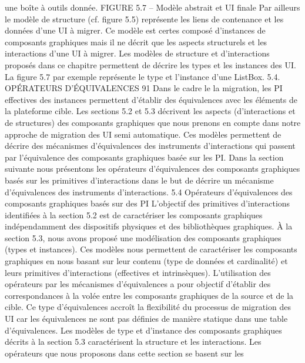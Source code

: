 \documentclass{article}
\begin{document}
une bo\^{i}te \`{a} outils donn\'{e}e.
FIGURE 5.7 – Mod\`{e}le abstrait et UI ﬁnale
Par ailleurs le mod\`{e}le de structure (cf. ﬁgure 5.5) repr\'{e}sente les liens de contenance et les donn\'{e}es
d’une UI \`{a} migrer. Ce mod\`{e}le est certes compos\'{e} d’instances de composants graphiques mais il ne
d\'{e}crit que les aspects structurels et les interactions d’une UI \`{a} migrer.
Les mod\`{e}les de structure et d’interactions propos\'{e}s dans ce chapitre permettent de d\'{e}crire les
types et les instances des UI. La ﬁgure 5.7 par exemple repr\'{e}sente le type et l’instance d’une ListBox.
5.4. OPÉRATEURS D’ÉQUIVALENCES
91
Dans le cadre le la migration, les PI effectives des instances permettent d’\'{e}tablir des \'{e}quivalences avec
les \'{e}l\'{e}ments de la plateforme cible.
Les sections 5.2 et 5.3 d\'{e}crivent les aspects (d’interactions et de structures) des composants graphiques que nous prenons en compte dans notre approche de migration des UI semi automatique.
Ces mod\`{e}les permettent de d\'{e}crire des m\'{e}canismes d’\'{e}quivalences des instruments d’interactions qui
passent par l’\'{e}quivalence des composants graphiques bas\'{e}e sur les PI. Dans la section suivante nous
pr\'{e}sentons les op\'{e}rateurs d’\'{e}quivalences des composants graphiques bas\'{e}s sur les primitives d’interactions dans le but de d\'{e}crire un m\'{e}canisme d’\'{e}quivalences des instruments d’interactions.
5.4
Op\'{e}rateurs d’\'{e}quivalences des composants graphiques bas\'{e}s sur
des PI
L’objectif des primitives d’interactions identiﬁ\'{e}es \`{a} la section 5.2 est de caract\'{e}riser les composants graphiques ind\'{e}pendamment des dispositifs physiques et des biblioth\`{e}ques graphiques. À la
section 5.3, nous avons propos\'{e} une mod\'{e}lisation des composants graphiques (types et instances). Ces
mod\`{e}les nous permettent de caract\'{e}riser les composants graphiques en nous basant sur leur contenu
(type de donn\'{e}es et cardinalit\'{e}) et leurs primitives d’interactions (effectives et intrins\`{e}ques). L’utilisation des op\'{e}rateurs par les m\'{e}canismes d’\'{e}quivalences a pour objectif d’\'{e}tablir des correspondances
\`{a} la vol\'{e}e entre les composants graphiques de la source et de la cible. Ce type d’\'{e}quivalences accro\^{i}t
la ﬂexibilit\'{e} du processus de migration des UI car les \'{e}quivalences ne sont pas d\'{e}ﬁnies de mani\`{e}re
statique dans une table d’\'{e}quivalences.
Les mod\`{e}les de type et d’instance des composants graphiques d\'{e}crits \`{a} la section 5.3 caract\'{e}risent
la structure et les interactions. Les op\'{e}rateurs que nous proposons dans cette section se basent sur les
\end{document}
